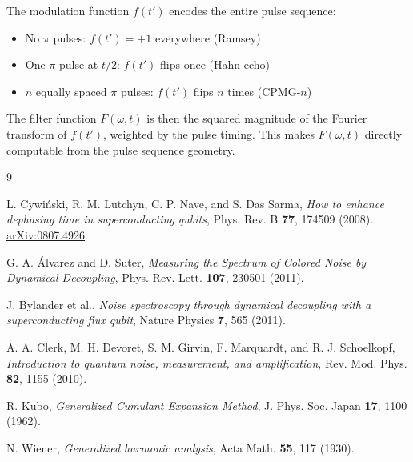 \documentclass[12pt]{article}
\begin{document}
The modulation function $f(t')$ encodes the entire pulse sequence:
\begin{itemize}
    \item No $\pi$ pulses: $f(t') = +1$ everywhere (Ramsey)
    \item One $\pi$ pulse at $t/2$: $f(t')$ flips once (Hahn echo)
    \item $n$ equally spaced $\pi$ pulses: $f(t')$ flips $n$ times (CPMG-$n$)
\end{itemize}

The filter function $F(\omega, t)$ is then the squared magnitude of the Fourier transform of $f(t')$, weighted by the pulse timing. This makes $F(\omega, t)$ directly computable from the pulse sequence geometry.

\begin{thebibliography}{9}

L. Cywi\'{n}ski, R. M. Lutchyn, C. P. Nave, and S. Das Sarma,
\textit{How to enhance dephasing time in superconducting qubits},
Phys. Rev. B \textbf{77}, 174509 (2008).
\href{https://arxiv.org/abs/0807.4926}{arXiv:0807.4926}

G. A. \'{A}lvarez and D. Suter,
\textit{Measuring the Spectrum of Colored Noise by Dynamical Decoupling},
Phys. Rev. Lett. \textbf{107}, 230501 (2011).

J. Bylander et al.,
\textit{Noise spectroscopy through dynamical decoupling with a superconducting flux qubit},
Nature Physics \textbf{7}, 565 (2011).

A. A. Clerk, M. H. Devoret, S. M. Girvin, F. Marquardt, and R. J. Schoelkopf,
\textit{Introduction to quantum noise, measurement, and amplification},
Rev. Mod. Phys. \textbf{82}, 1155 (2010).

R. Kubo,
\textit{Generalized Cumulant Expansion Method},
J. Phys. Soc. Japan \textbf{17}, 1100 (1962).

N. Wiener,
\textit{Generalized harmonic analysis},
Acta Math. \textbf{55}, 117 (1930).

\end{thebibliography}
\end{document}
